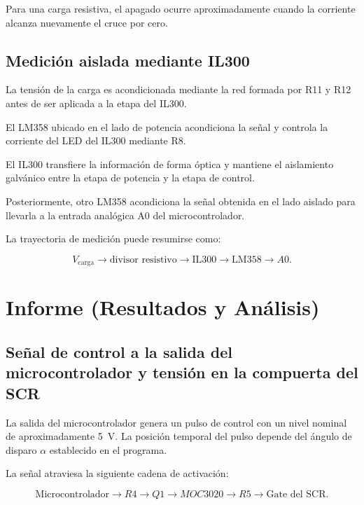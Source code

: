 \documentclass[12pt]{article}
\begin{document}
Para una carga resistiva, el apagado ocurre aproximadamente cuando la
corriente alcanza nuevamente el cruce por cero.

\subsection{Medición aislada mediante IL300}

La tensión de la carga es acondicionada mediante la red formada por R11 y
R12 antes de ser aplicada a la etapa del IL300.

El LM358 ubicado en el lado de potencia acondiciona la señal y controla la
corriente del LED del IL300 mediante R8.

El IL300 transfiere la información de forma óptica y mantiene el aislamiento
galvánico entre la etapa de potencia y la etapa de control.

Posteriormente, otro LM358 acondiciona la señal obtenida en el lado aislado
para llevarla a la entrada analógica A0 del microcontrolador.

La trayectoria de medición puede resumirse como:

\[
V_{\mathrm{carga}}
\rightarrow
\text{divisor resistivo}
\rightarrow
\text{IL300}
\rightarrow
\text{LM358}
\rightarrow
A0.
\]


\section{Informe (Resultados y Análisis)}

\subsection{Señal de control a la salida del microcontrolador y tensión
en la compuerta del SCR}

La salida del microcontrolador genera un pulso de control con un nivel
nominal de aproximadamente \SI{5}{V}. La posición temporal del pulso depende
del ángulo de disparo $\alpha$ establecido en el programa.

La señal atraviesa la siguiente cadena de activación:

\[
\text{Microcontrolador}
\rightarrow R4
\rightarrow Q1
\rightarrow MOC3020
\rightarrow R5
\rightarrow \text{Gate del SCR}.
\]
\end{document}
